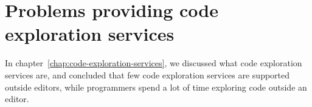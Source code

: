 
\chapter{Problems providing code exploration services}
\label{chap:problems-providing-code-exploration-services}


In chapter~\ref{chap:code-exploration-services}, we discussed what code exploration services are, and
concluded that few code exploration services are supported outside editors, while programmers spend
a lot of time exploring code outside an editor.

